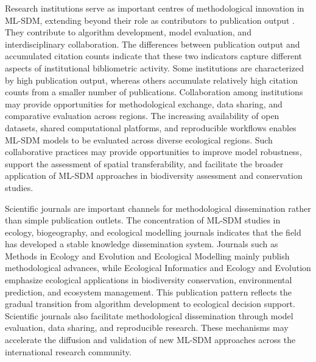 \documentclass[authoryear,preprint,review,12pt]{elsarticle}
\begin{document}
Research institutions serve as important centres of methodological innovation in ML-SDM, extending beyond their role as contributors to publication output \citep{wuchty2007increasing}. They contribute to algorithm development, model evaluation, and interdisciplinary collaboration. The differences between publication output and accumulated citation counts indicate that these two indicators capture different aspects of institutional bibliometric activity. Some institutions are characterized by high publication output, whereas others accumulate relatively high citation counts from a smaller number of publications. Collaboration among institutions may provide opportunities for methodological exchange, data sharing, and comparative evaluation across regions. The increasing availability of open datasets, shared computational platforms, and reproducible workflows enables ML-SDM models to be evaluated across diverse ecological regions. Such collaborative practices may provide opportunities to improve model robustness, support the assessment of spatial transferability, and facilitate the broader application of ML-SDM approaches in biodiversity assessment and conservation studies.

Scientific journals are important channels for methodological dissemination rather than simple publication outlets. The concentration of ML-SDM studies in ecology, biogeography, and ecological modelling journals indicates that the field has developed a stable knowledge dissemination system. Journals such as Methods in Ecology and Evolution and Ecological Modelling mainly publish methodological advances, while Ecological Informatics and Ecology and Evolution emphasize ecological applications in biodiversity conservation, environmental prediction, and ecosystem management. This publication pattern reflects the gradual transition from algorithm development to ecological decision support. Scientific journals also facilitate methodological dissemination through model evaluation, data sharing, and reproducible research. These mechanisms may accelerate the diffusion and validation of new ML-SDM approaches across the international research community.
\end{document}
